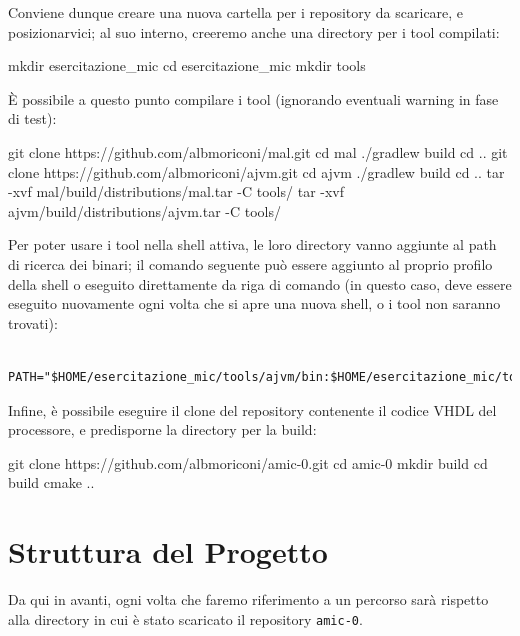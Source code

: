 \documentclass[a4paper,12pt]{scrreprt}
\begin{document}
Conviene dunque creare una nuova cartella per i repository da scaricare, e
posizionarvici; al suo interno, creeremo anche una directory per i tool compilati:

\begin{commandshell}
mkdir esercitazione_mic
cd esercitazione_mic
mkdir tools
\end{commandshell}

È possibile a questo punto compilare i tool (ignorando eventuali warning in fase
di test):

\begin{commandshell}
git clone https://github.com/albmoriconi/mal.git
cd mal
./gradlew build
cd ..
git clone https://github.com/albmoriconi/ajvm.git
cd ajvm
./gradlew build
cd ..
tar -xvf mal/build/distributions/mal.tar -C tools/
tar -xvf ajvm/build/distributions/ajvm.tar -C tools/
\end{commandshell}

Per poter usare i tool nella shell attiva, le loro directory vanno aggiunte al
path di ricerca dei binari; il comando seguente può essere aggiunto al proprio
profilo della shell o eseguito direttamente da riga di comando (in questo caso,
deve essere eseguito nuovamente ogni volta che si apre una nuova shell, o i tool
non saranno trovati):

\begin{lstlisting}
  PATH="$HOME/esercitazione_mic/tools/ajvm/bin:$HOME/esercitazione_mic/tools/mal/bin:$PATH"
\end{lstlisting}

Infine, è possibile eseguire il clone del repository contenente il codice VHDL
del processore, e predisporne la directory per la build:

\begin{commandshell}
  git clone https://github.com/albmoriconi/amic-0.git
  cd amic-0
  mkdir build
  cd build
  cmake ..
\end{commandshell}

\section{Struttura del Progetto}

Da qui in avanti, ogni volta che faremo riferimento a un percorso sarà rispetto
alla directory in cui è stato scaricato il repository \lstinline{amic-0}.
\end{document}
